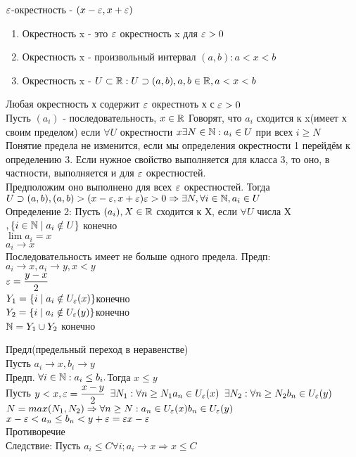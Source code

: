 $ \varepsilon$-окрестность - $ (x - \varepsilon, x+\varepsilon) $\\
\begin{enumerate}
	\item  Окрестность x - это $ \varepsilon $ окрестность x для $ \varepsilon > 0 $
	\item Окрестность x - произвольный интервал $ (a ,b) : a < x < b$
	\item Окрестность x - $U \subset \mathbb{R} :  U \supset (a, b) , a, b \in \mathbb{R}, a < x < b $ 
\end{enumerate}
Любая окрестность х содержит $\varepsilon $ окрестноть х с $ \varepsilon > 0 $ \\
Пусть $(a_i)$ - последовательность, $ x \in \mathbb{R} $ Говорят, что $a_i$ сходится к x(имеет х своим пределом) если $ \forall U $ окрестности $x \exists N \in \mathbb{N} : a_i \in U $ при всех $ i \geq N $ \\
Понятие предела не изменится, если мы определения окрестности 1 перейдём к определению 3. Если нужное свойство выполняется для класса 3, то оно, в частности, выполняется и для $ \varepsilon $ окрестностей. \\
Предположим оно выполнено для всех $ \varepsilon $ окрестностей. Тогда $ U \supset(a, b), (a,b) > (x-\varepsilon, x+ \varepsilon) \varepsilon > 0 \Rightarrow \exists N, \forall i \in \mathbb{N}, a_i \in U$  \\
Определение 2: Пусть $(a_i), X \in \mathbb{R}$ сходится к Х, если $\forall U $ 	числа Х $, \{ i \in \mathbb{N} \mid a_i \notin U \} $ конечно \\
$ \lim a_i = x $ \\
$ a_i \rightarrow x $ \\
Последовательность имеет не больше одного предела.
Предп: $ a_i \rightarrow x, a_i \rightarrow y, x < y $ \\
$ \varepsilon = \dfrac{y-x}{2} $ \\
$Y_1 = \{ i \mid a_i \notin U_{\varepsilon} (x) \} $конечно\\
$ Y_2 = \{ i \mid a_i \notin U_{\varepsilon} (y) \} $конечно\\
$ \mathbb{N} = Y_1 \cup Y_2 $ конечно

Предл(предельный переход в неравенстве) \\
Пусть $ a_i \rightarrow x, b_i \rightarrow y $ \\
Предп. $ \forall i \in \mathbb{N} : a_i \leq b_i. $Тогда $ x\leq y $ \\
Пусть $ y < x, \varepsilon = \dfrac{x-y}{2} $ 
$ \exists N_1 : \forall n \geq N_1 a_n \in U_{\varepsilon}(x) $
$ \exists N_2 : \forall n \geq N_2 b_n \in U_{\varepsilon}(y) $
$  N = max(N_1, N_2) \Rightarrow \forall n \geq N : 
a_n \in U_{\varepsilon}(x)\\
b_n \in U_{\varepsilon}(y)$\\
$ x- \varepsilon <  a_n \leq b_n < y+\varepsilon = \varepsilon x-\varepsilon$\\
Противоречие \\
Следствие: Пусть $ a_i \leq C \forall i; a_i \rightarrow x \Rightarrow x \leq C $\\

